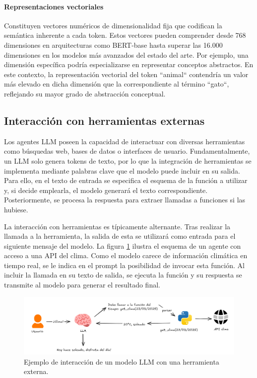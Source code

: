 \paragraph{Representaciones vectoriales}
Constituyen vectores numéricos de dimensionalidad fija que codifican la semántica inherente a cada token. Estos vectores pueden comprender desde 768 dimensiones en arquitecturas como BERT-base hasta superar las 16.000 dimensiones en los modelos más avanzados del estado del arte. Por ejemplo, una dimensión específica podría especializarse en representar conceptos abstractos. En este contexto, la representación vectorial del token ``animal`` contendría un valor más elevado en dicha dimensión que la correspondiente al término ``gato``, reflejando su mayor grado de abstracción conceptual.


\subsection{Interacción con herramientas externas}
Los agentes LLM poseen la capacidad de interactuar con diversas herramientas como búsquedas web\cite{nakano_webgpt_nodate}, bases de datos o interfaces de usuario. Fundamentalmente, un LLM solo genera tokens de texto, por lo que la integración de herramientas se implementa mediante palabras clave que el modelo puede incluir en su salida. Para ello, en el texto de entrada se especifica el esquema de la función a utilizar y, si decide emplearla, el modelo generará el texto correspondiente. Posteriormente, se procesa la respuesta para extraer llamadas a funciones si las hubiese.

La interacción con herramientas es típicamente alternante. Tras realizar la llamada a la herramienta, la salida de esta se utilizará como entrada para el siguiente mensaje del modelo. La figura \ref{fig:herramientas} ilustra el esquema de un agente con acceso a una API del clima. Como el modelo carece de información climática en tiempo real, se le indica en el prompt la posibilidad de invocar esta función. Al incluir la llamada en su texto de salida, se ejecuta la función y su respuesta se transmite al modelo para generar el resultado final.



\begin{figure}[H]
  \centering
  \includegraphics[width=1\linewidth]{figures/herramienta.png}
  \caption{Ejemplo de interacción de un modelo LLM con una herramienta externa.}
  \label{fig:herramientas}
\end{figure}

